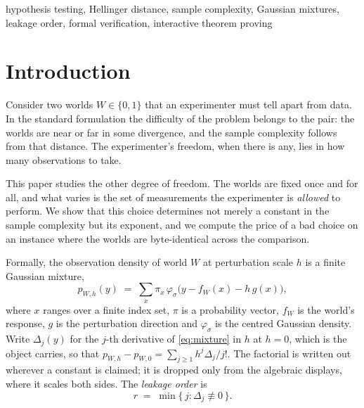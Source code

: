 \begin{IEEEkeywords}
hypothesis testing, Hellinger distance, sample complexity, Gaussian mixtures, leakage order,
formal verification, interactive theorem proving
\end{IEEEkeywords}

\section{Introduction}

Consider two worlds $W\in\{0,1\}$ that an experimenter must tell apart from data. In the
standard formulation the difficulty of the problem belongs to the pair: the worlds are near
or far in some divergence, and the sample complexity follows from that distance. The
experimenter's freedom, when there is any, lies in how many observations to take.

This paper studies the other degree of freedom. The worlds are fixed once and for all, and
what varies is the set of measurements the experimenter is \emph{allowed} to perform. We
show that this choice determines not merely a constant in the sample complexity but its
exponent, and we compute the price of a bad choice on an instance where the worlds are
byte-identical across the comparison.

Formally, the observation density of world $W$ at perturbation scale $h$ is a finite
Gaussian mixture,
\begin{equation}
p_{W,h}(y)\;=\;\sum_{x}\pi_{x}\,
   \varphi_{\sigma}\bigl(y-f_{W}(x)-h\,g(x)\bigr),
\label{eq:mixture}
\end{equation}
where $x$ ranges over a finite index set, $\pi$ is a probability vector, $f_{W}$ is the
world's response, $g$ is the perturbation direction and $\varphi_{\sigma}$ is the centred
Gaussian density. Write $\Delta_{j}(y)$ for the $j$-th derivative of \eqref{eq:mixture} in
$h$ at $h=0$, which is the object  carries, so that
$p_{W,h}-p_{W,0}=\sum_{j\ge1}h^{j}\Delta_{j}/j!$. The factorial is written out wherever a
constant is claimed; it is dropped only from the algebraic displays, where it scales both
sides. The \emph{leakage order} is
\begin{equation}
r \;=\; \min\{\, j : \Delta_{j}\not\equiv 0 \,\}.
\label{eq:order}
\end{equation}

